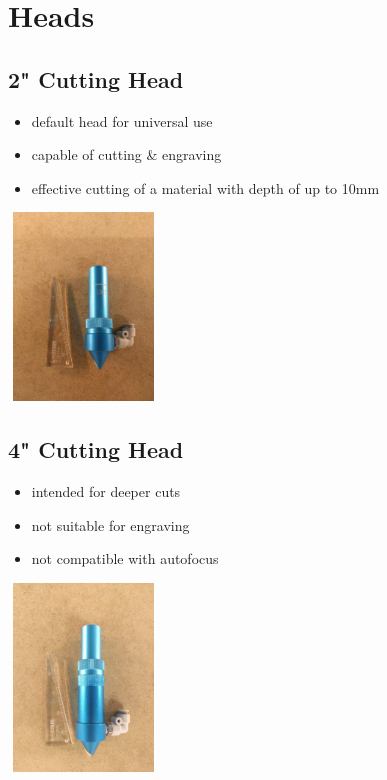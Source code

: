 \documentclass[fleqn]{article}
\begin{document}



\clearpage
\section{Heads}
\setlength{\columnseprule}{0.5pt}
\def\columnseprulecolor{\color{black}}
\begin{multicols}{3}\setlength{\parindent}{1em}
	
	
\begin{center}
	\subsection{2" Cutting Head}
\end{center}
\begin{itemize}[topsep=8pt]
	\item default head for universal use
	\item capable of cutting \& engraving
	\item effective cutting of a material with depth of up to 10mm
\end{itemize}
\begin{center}
	\includegraphics[width=4cm, height=5cm]{imgs/head_2.jpeg}
\end{center}


\vfill\null
\columnbreak
	
\begin{center}	
	\subsection{4" Cutting Head}
\end{center}
\begin{itemize}[topsep=8pt]
	\item intended for deeper cuts
	\item not suitable for engraving
	\item not compatible with autofocus
\end{itemize}
\medskip
\begin{center}
	\includegraphics[width=4cm, height=5cm]{imgs/head_4.jpeg}
\end{center}
\vfill\null
\columnbreak


\end{multicols}
\end{document}
